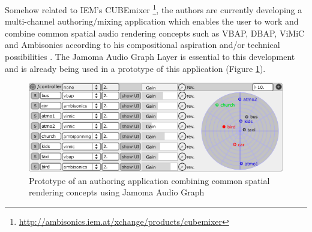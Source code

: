 \documentclass[twoside,a4paper]{article}
\begin{document}
Somehow related to IEM's CUBEmixer \footnote{\url{http://ambisonics.iem.at/xchange/products/cubemixer}}, the authors are currently developing a multi-channel authoring/mixing application which enables the user to work and combine common spatial audio rendering concepts such as VBAP, DBAP, ViMiC \cite{Peters:2008b} and Ambisonics according to his compositional aspiration and/or technical possibilities \cite{Peters:2009}. The Jamoma Audio Graph Layer is essential to this development and is already being used in a prototype of this application (Figure \ref{fig:SceneMixer}).
\begin{figure}[htbp]
	\centering
		\includegraphics[width=1\columnwidth]{SceneMixer.png}
	\caption{Prototype of an authoring application combining common spatial rendering concepts using Jamoma Audio Graph}
	\label{fig:SceneMixer}
\end{figure}

%                                    
\end{document}
